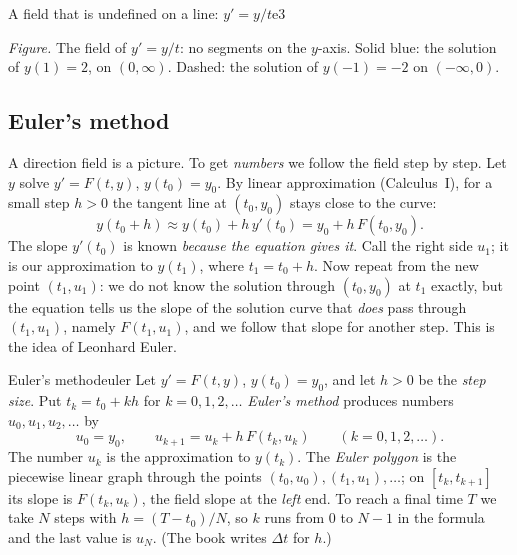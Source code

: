 \documentclass[11pt]{article}
\begin{document}
\begin{exmp}{A field that is undefined on a line: $y'=y/t$}{e3}
\begin{center}
\par\small\emph{Figure.} The field of $y'=y/t$: no segments on the $y$-axis. Solid blue: the solution of $y(1)=2$, on $(0,\infty)$. Dashed: the solution of $y(-1)=-2$ on $(-\infty,0)$.
\end{center}
\end{exmp}

\subsection*{Euler's method}

A direction field is a picture. To get \emph{numbers} we follow the field step by step. Let $y$ solve $y'=F(t,y)$, $y(t_0)=y_0$. By linear approximation (Calculus~I), for a small step $h>0$ the tangent line at $(t_0,y_0)$ stays close to the curve:
\[
y(t_0+h)\approx y(t_0)+h\,y'(t_0)=y_0+h\,F(t_0,y_0).
\]
The slope $y'(t_0)$ is known \emph{because the equation gives it}. Call the right side $u_1$; it is our approximation to $y(t_1)$, where $t_1=t_0+h$. Now repeat from the new point $(t_1,u_1)$: we do not know the solution through $(t_0,y_0)$ at $t_1$ exactly, but the equation tells us the slope of the solution curve that \emph{does} pass through $(t_1,u_1)$, namely $F(t_1,u_1)$, and we follow that slope for another step. This is the idea of Leonhard Euler.

\begin{defn}{Euler's method}{euler}
Let $y'=F(t,y)$, $y(t_0)=y_0$, and let $h>0$ be the \emph{step size}. Put $t_k=t_0+kh$ for $k=0,1,2,\dots$ \emph{Euler's method} produces numbers $u_0,u_1,u_2,\dots$ by
\[
u_0=y_0,\qquad u_{k+1}=u_k+h\,F(t_k,u_k)\qquad(k=0,1,2,\dots).
\]
The number $u_k$ is the approximation to $y(t_k)$. The \emph{Euler polygon} is the piecewise linear graph through the points $(t_0,u_0),(t_1,u_1),\dots$; on $[t_k,t_{k+1}]$ its slope is $F(t_k,u_k)$, the field slope at the \emph{left} end. To reach a final time $T$ we take $N$ steps with $h=(T-t_0)/N$, so $k$ runs from $0$ to $N-1$ in the formula and the last value is $u_N$. (The book writes $\Delta t$ for $h$.)
\end{defn}
\end{document}
